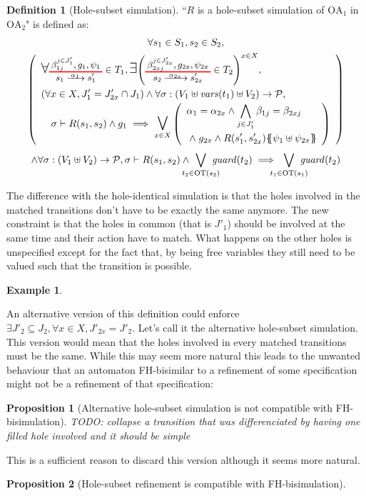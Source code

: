 \documentclass{article}
\theoremstyle{plain}
\newtheorem{prop}{Proposition}
\theoremstyle{definition}
\newtheorem{defi}{Definition}
\newtheorem{exi}{Example}
\newcommand\nmm[1]{\(\displaystyle #1\)} %
\newcommand\mpar[1]{{\left(#1\right)}}
\newcommand\mbrc[1]{{\left\{#1\right\}}}
\newcommand\psubst[1]{\mbrc{\!\!\mbrc{#1}\!\!}}
\newcommand\subbox[1]{{\makebox[.5\width]{\(\scriptstyle #1\)}}}
\newcommand\bigsymb[2][\Large]{\text{#1\nmm{#2}}} %
\newcommand\nwedge{\DOTSB\;{\wedge}\;} %
\newcommand\fvars[1]{{\mathit{vars}\mpar{#1}}}
\newcommand\values{{\mathcal{P}}}
\newcommand\OT[6]{\text{\small\(%
	\setlength\arraycolsep{2pt}\everymath{\displaystyle}%
	\renewcommand\arraystretch{1}%
	\begin{array}{c}%
	#4,#5,#6 \\\noalign{\color{red}\hrule height 1pt}
	#1\xrightarrow{\raisebox{-1.5pt}[.8\height][0pt]{\makebox[1.4\width]{\(\scriptstyle #3\)}}}#2
	\end{array}\)}}
\newcommand\OTx[4]{\OT{s_{#1}}{s'_{#1 #2}}{\alpha_{#1 #2}}{\beta_{#3 j}^{j \in J'_{#4}}}{g_{#1 #2}}{\psi_{#1 #2}}}
\begin{document}
\begin{defi}[Hole-subset simulation]
``\(R\) is a hole-subset simulation of \(\mathrm{OA}_1\) in \(\mathrm{OA}_2\)" is defined as:
\begin{multline*}
	\forall s_1 \in S_1, s_2 \in S_2, \\
	\mpar{\renewcommand\arraystretch{1.4}\everymath{\displaystyle}\begin{array}{l}
		\bigsymb{\forall} \OTx{1}{}{1}{1} \in T_1, \bigsymb{\exists} \mpar{\OTx{2}{x}{2x}{2x} \in T_2}^{x \in X}, \\
		\mpar{\forall x \in X, J'_1 = J'_{2x} \cap J_1} \wedge \forall \sigma: \mpar{V_1 \uplus \fvars{t_1} \uplus V_2} \to \values, \\
		\quad \sigma \vdash R\mpar{s_1, s_2} \wedge g_1 \implies \operatorname*{\bigsymb{\bigvee}}_{x \in X} \mpar{\begin{array}{l}
			\alpha_1 = \alpha_{2x} \wedge \bigwedge_{j \in J'_1} \beta_{1j} = \beta_{2xj} \\
			\nwedge g_{2x} \wedge R\mpar{s'_1, s'_{2x}}\psubst{\psi_1 \uplus \psi_{2x}}
		\end{array}} \\
	\end{array}} \\
	\wedge \forall \sigma: \mpar{V_1 \uplus V_2} \to \values, \sigma \vdash R\mpar{s_1, s_2} \wedge \bigvee_\subbox{t_2 \in \mathrm{OT}\mpar{s_2}} \mathit{guard}\mpar{t_2} \implies \bigvee_\subbox{t_1 \in \mathrm{OT}\mpar{s_1}} \mathit{guard}\mpar{t_2}
\end{multline*}
\end{defi}
The difference with the hole-identical simulation is that the holes involved in the matched transitions don't have to be exactly the same anymore.
The new constraint is that the holes in common (that is \(J'_1\)) should be involved at the same time and their action have to match.
What happens on the other holes is unspecified except for the fact that, by being free variables they still need to be valued such that the transition is possible.

\begin{exi} %
\end{exi}

An alternative version of this definition could enforce \(\exists J'_2 \subseteq J_2, \forall x \in X, J'_{2x} = J'_2\).
Let's call it the alternative hole-subset simulation.
This version would mean that the holes involved in every matched transitions must be the same.
While this may seem more natural this leads to the unwanted behaviour that an automaton FH-bisimilar to a refinement of some specification might not be a refinement of that specification:
\begin{prop}[Alternative hole-subset simulation is not compatible with FH-bisimulation]
TODO: collapse a transition that was differenciated by having one filled hole involved and it should be simple
\end{prop}
This is a sufficient reason to discard this version although it seems more natural.
\begin{prop}[Hole-subset refinement is compatible with FH-bisimulation]
\end{prop}
\end{document}
